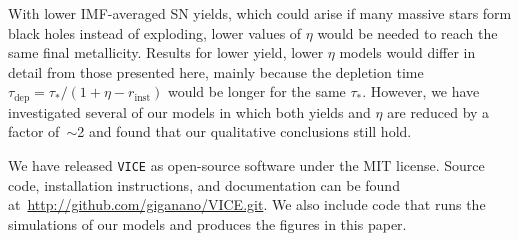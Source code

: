 With lower IMF-averaged SN yields, which could 
arise if many massive stars form black holes instead of exploding, lower 
values of $\eta$ would be needed to reach the same final metallicity.  
Results for lower yield, lower $\eta$ models would differ in detail from those 
presented here, mainly because the depletion time $\tau_\text{dep} = 
\tau_*/(1 + \eta - r_\text{inst})$ would be longer for the same $\tau_*$. 
However, we
have investigated several of our models in which both yields and $\eta$ are 
reduced by a factor of~$\sim$2 and found that our qualitative conclusions 
still hold. 
\par 
We have released \texttt{VICE} as open-source software under the MIT 
license. Source code, installation instructions, and documentation can be 
found at~\url{http://github.com/giganano/VICE.git}. We also include code that 
runs the simulations of our models and produces the figures in this paper. 
